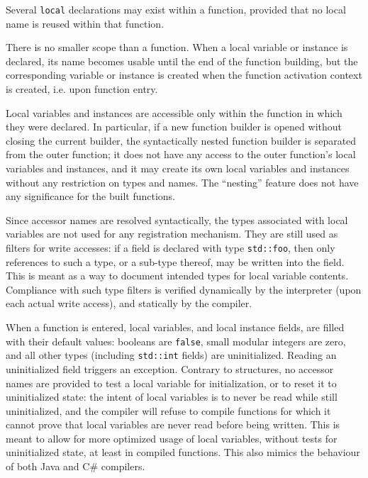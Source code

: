 Several \verb|local| declarations may exist within a function, provided
that no local name is reused within that function.

There is no smaller scope than a function. When a local variable or
instance is declared, its name becomes usable until the end of the
function building, but the corresponding variable or instance is created
when the function activation context is created, i.e. upon function
entry.

Local variables and instances are accessible only within the function in
which they were declared. In particular, if a new function builder is
opened without closing the current builder, the syntactically nested
function builder is separated from the outer function; it does not have
any access to the outer function's local variables and instances, and it
may create its own local variables and instances without any restriction
on types and names. The ``nesting'' feature does not have any
significance for the built functions.

Since accessor names are resolved syntactically, the types associated
with local variables are not used for any registration mechanism. They
are still used as filters for write accesses: if a field is declared
with type \verb|std::foo|, then only references to such a type, or a
sub-type thereof, may be written into the field. This is meant as a way
to document intended types for local variable contents. Compliance with
such type filters is verified dynamically by the interpreter (upon each
actual write access), and statically by the compiler.

\begin{rationale}
When a function is entered, local variables, and local instance fields,
are filled with their default values: booleans are \verb|false|, small
modular integers are zero, and all other types (including
\verb|std::int| fields) are uninitialized. Reading an uninitialized
field triggers an exception. Contrary to structures, no accessor names
are provided to test a local variable for initialization, or to reset it
to uninitialized state: the intent of local variables is to never be
read while still uninitialized, and the compiler will refuse to compile
functions for which it cannot prove that local variables are never read
before being written. This is meant to allow for more optimized usage of
local variables, without tests for uninitialized state, at least in
compiled functions. This also mimics the behaviour of both Java and C\#
compilers.
\end{rationale}

